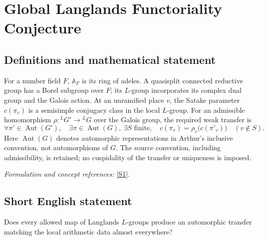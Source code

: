 \documentclass[11pt,a4paper]{article}
\newcommand{\A}{\mathbb{A}}
\newcommand{\sref}[2]{\hyperlink{source:#1:#2}{[S#2]}}
\newif\ifshowcatalogue
\newcommand{\cataloguescope}[1]{\ifshowcatalogue
 \paragraph{Exact scope in the supplied catalogue.}
 \begin{quote}\small #1\end{quote}\fi}
\begin{document}
\setcounter{section}{0}
\clearpage
\section*{\texorpdfstring{Global Langlands Functoriality Conjecture}{Global Langlands Functoriality Conjecture}}\label{30006675}
\subsection{Definitions and mathematical statement}
For a number field $F$, $\A_F$ is its ring of adeles. A quasisplit connected reductive group has a Borel subgroup over $F$; its $L$-group incorporates its complex dual group and the Galois action. At an unramified place $v$, the Satake parameter $c(\pi_v)$ is a semisimple conjugacy class in the local $L$-group. For an admissible homomorphism $\rho:{}^LG'\to{}^LG$ over the Galois group, the required weak transfer is
\[
 \forall\pi'\in\operatorname{Aut}(G'),\quad \exists\pi\in\operatorname{Aut}(G),\ \exists S\text{ finite},\quad
 c(\pi_v)=\rho_v\bigl(c(\pi'_v)\bigr)\quad(v\notin S).
\]
Here $\operatorname{Aut}(G)$ denotes automorphic representations in Arthur's inclusive convention, not automorphisms of $G$. The source convention, including admissibility, is retained; no cuspidality of the transfer or uniqueness is imposed.
\par\smallskip\textit{Formulation and concept references:} \sref{30006675}{1}.
\cataloguescope{For every number field F, quasisplit connected reductive F-groups G-prime and G, and admissible L-homomorphism rho:L(G-prime)->L(G) (over Gamma\_F, commuting with its projections, in Arthur Principle1.1's convention), every automorphic representation pi-prime of G-prime(A\_F), in the inclusive Langlands sense cited there, has an automorphic representation pi of G(A\_F) whose unramified Satake classes equal the images under rho\_v of those of pi-prime outside a finite set of places. This is existence of a weak transfer, not uniqueness or a prescribed transfer function.}
\subsection{Short English statement}
Does every allowed map of Langlands $L$-groups produce an automorphic transfer matching the local arithmetic data almost everywhere?
\end{document}
